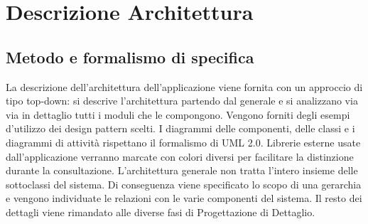 %


\section{Descrizione Architettura} %
\label{sec:descrizione_architettura}

\subsection{Metodo e formalismo di specifica}
La descrizione dell'architettura dell'applicazione viene fornita con un approccio di tipo top-down: si descrive l'architettura partendo dal generale e si analizzano via via in dettaglio tutti i moduli che le compongono. Vengono forniti degli esempi d'utilizzo dei design pattern scelti. I diagrammi delle componenti, delle classi e i diagrammi di attività rispettano il formalismo di UML 2.0. \newline
Librerie esterne usate dall'applicazione verranno marcate con colori diversi per facilitare la distinzione durante la consultazione. \newline
L’architettura generale non tratta l’intero insieme delle sottoclassi del sistema. Di conseguenza viene specificato lo scopo di una gerarchia e vengono individuate le relazioni con le varie componenti del sistema. Il resto dei dettagli viene rimandato alle diverse fasi di Progettazione di Dettaglio.


